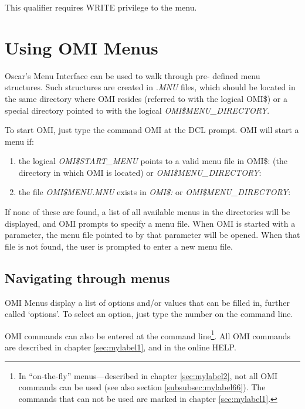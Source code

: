 \documentclass[a4paper]{book}
\newcommand{\vs}{\vspace{3mm}}
\begin{document}
\vs

This qualifier requires WRITE privilege to the menu.

\chapter{Using OMI Menus}
\label{sec:using}

Oscar's Menu Interface can be used to walk through pre- defined menu 
structures. Such structures are created in \textsl{.MNU} files, which should be 
located in the same directory where OMI resides (referred to with the 
logical OMI{\$}) or a special directory pointed to with the logical 
\textsl{OMI{\$}MENU{\_}DIRECTORY}.

To start OMI, just type the command OMI at the DCL prompt. OMI will start a 
menu if:
\begin{enumerate}
\item the logical \textsl{OMI{\$}START{\_}MENU} points to a valid menu file in 
OMI{\$}: (the directory in which OMI is located)
or \textsl{OMI{\$}MENU{\_}DIRECTORY}:

\item the file \textsl{OMI{\$}MENU.MNU} exists in \textsl{OMI{\$}:} or
\textsl{OMI{\$}MENU{\_}DIRECTORY}:
\end{enumerate}

If none of these are found, a list of all available menus in the directories 
will be displayed, and OMI prompts to specify a menu file. When OMI is 
started with a parameter, the menu file pointed to by that parameter will be 
opened. When that file is not found, the user is prompted to enter a new 
menu file.

\section{Navigating through menus}
\label{subsec:navigating}

OMI Menus display a list of options and/or values that can be filled in, 
further called `options'. To select an option, just type the number on the 
command line.

\vs

OMI commands can also be entered at the command line\footnote{ In 
``on-the-fly'' menus---described in chapter \ref{sec:mylabel2},
not all OMI commands can be used (see also section 
\ref{subsubsec:mylabel66}). The commands that can not be used are 
marked in chapter \ref{sec:mylabel1}.}. All OMI commands are 
described in chapter \ref{sec:mylabel1}, and in the online HELP.
\end{document}
